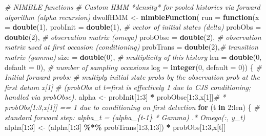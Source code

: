\documentclass[
  12pt,
]{krantz}
\newenvironment{Shaded}{\begin{snugshade}}{\end{snugshade}}
\newcommand{\AttributeTok}[1]{\textcolor[rgb]{0.13,0.29,0.53}{#1}}
\newcommand{\CommentTok}[1]{\textcolor[rgb]{0.56,0.35,0.01}{\textit{#1}}}
\newcommand{\ControlFlowTok}[1]{\textcolor[rgb]{0.13,0.29,0.53}{\textbf{#1}}}
\newcommand{\DecValTok}[1]{\textcolor[rgb]{0.00,0.00,0.81}{#1}}
\newcommand{\FunctionTok}[1]{\textcolor[rgb]{0.13,0.29,0.53}{\textbf{#1}}}
\newcommand{\NormalTok}[1]{#1}
\newcommand{\OtherTok}[1]{\textcolor[rgb]{0.56,0.35,0.01}{#1}}
\newcommand{\SpecialCharTok}[1]{\textcolor[rgb]{0.81,0.36,0.00}{\textbf{#1}}}
\begin{document}
\begin{Shaded}
\begin{Highlighting}[]
\CommentTok{\# NIMBLE functions}
\CommentTok{\# Custom HMM *density* for pooled histories via forward algorithm (alpha recursion)}
\NormalTok{dwolfHMM }\OtherTok{\textless{}{-}} \FunctionTok{nimbleFunction}\NormalTok{(}
  \AttributeTok{run =} \ControlFlowTok{function}\NormalTok{(}\AttributeTok{x =} \FunctionTok{double}\NormalTok{(}\DecValTok{1}\NormalTok{), }
                 \AttributeTok{probInit =} \FunctionTok{double}\NormalTok{(}\DecValTok{1}\NormalTok{), }\CommentTok{\# vector of initial states (delta)}
                 \AttributeTok{probObs =} \FunctionTok{double}\NormalTok{(}\DecValTok{2}\NormalTok{),  }\CommentTok{\# observation matrix (omega)}
                 \AttributeTok{probObse =} \FunctionTok{double}\NormalTok{(}\DecValTok{2}\NormalTok{), }\CommentTok{\# observation matrix used at first occasion (conditioning)}
                 \AttributeTok{probTrans =} \FunctionTok{double}\NormalTok{(}\DecValTok{2}\NormalTok{),}\CommentTok{\# transition matrix (gamma)}
                 \AttributeTok{size =} \FunctionTok{double}\NormalTok{(}\DecValTok{0}\NormalTok{),     }\CommentTok{\# multiplicity of this history}
                 \AttributeTok{len =} \FunctionTok{double}\NormalTok{(}\DecValTok{0}\NormalTok{, }\AttributeTok{default =} \DecValTok{0}\NormalTok{), }\CommentTok{\# number of sampling occasions}
                 \AttributeTok{log =} \FunctionTok{integer}\NormalTok{(}\DecValTok{0}\NormalTok{, }\AttributeTok{default =} \DecValTok{0}\NormalTok{)) \{}
    \CommentTok{\# Initial forward probs:}
    \CommentTok{\# multiply initial state probs by the observation prob at the first datum x[1]}
    \CommentTok{\# (probObs at t=first is effectively 1 due to CJS conditioning; handled via \textquotesingle{}probObse\textquotesingle{}).}
\NormalTok{    alpha }\OtherTok{\textless{}{-}}\NormalTok{ probInit[}\DecValTok{1}\SpecialCharTok{:}\DecValTok{3}\NormalTok{] }\SpecialCharTok{*}\NormalTok{ probObse[}\DecValTok{1}\SpecialCharTok{:}\DecValTok{3}\NormalTok{,x[}\DecValTok{1}\NormalTok{]]}\CommentTok{\# * probObs[1:3,x[1]] == 1 due to conditioning on first detection}
    \ControlFlowTok{for}\NormalTok{ (t }\ControlFlowTok{in} \DecValTok{2}\SpecialCharTok{:}\NormalTok{len) \{}
      \CommentTok{\# standard forward step: alpha\_t = (alpha\_\{t{-}1\} * Gamma) .* Omega(:, y\_t)}
\NormalTok{      alpha[}\DecValTok{1}\SpecialCharTok{:}\DecValTok{3}\NormalTok{] }\OtherTok{\textless{}{-}}\NormalTok{ (alpha[}\DecValTok{1}\SpecialCharTok{:}\DecValTok{3}\NormalTok{] }\SpecialCharTok{\%*\%}\NormalTok{ probTrans[}\DecValTok{1}\SpecialCharTok{:}\DecValTok{3}\NormalTok{,}\DecValTok{1}\SpecialCharTok{:}\DecValTok{3}\NormalTok{]) }\SpecialCharTok{*}\NormalTok{ probObs[}\DecValTok{1}\SpecialCharTok{:}\DecValTok{3}\NormalTok{,x[t]]}

\end{Highlighting}
\end{Shaded}
\end{document}
